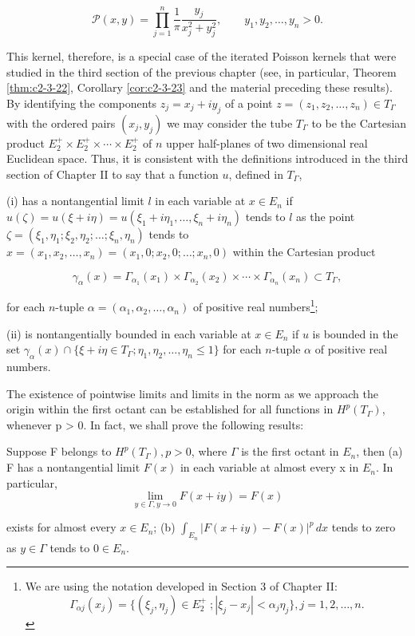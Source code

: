 \[
\mathcal{P}(x,y)=\prod_{j=1}^{n}\frac{1}{\pi}\frac{y_{j}}{x_{j}^{2}+y_{j}^{2}},\qquad y_{1},y_{2},\ldots,y_{n}>0.
\]

This kernel, therefore, is a special case of the iterated Poisson kernels that were studied in the third section of the previous chapter (see, in particular, Theorem \ref{thm:c2-3-22}, Corollary \ref{cor:c2-3-23} and the material preceding these results). By identifying the components $z_j = x_j + iy_j$ of a point $z = (z_1, z_2, \ldots, z_n) \in T_\Gamma$ with the ordered pairs $(x_j, y_j)$ we may consider the tube $T_\Gamma$ to be the Cartesian product $E_2^+ \times E_2^+\times\cdots\times E_2^+$ of $n$ upper half-planes of two dimensional real Euclidean space. Thus, it is consistent with the definitions introduced in the third section of Chapter II to say that a function $u$, defined in $T_\Gamma$,

(i) has a nontangential limit $l$ in each variable at $x \in E_n$ if $u(\zeta) = u(\xi + i\eta) = u(\xi_1 + i\eta_1, \ldots, \xi_n + i\eta_n)$ tends to $l$ as the point $\zeta = (\xi_1, \eta_1; \xi_2, \eta_2; \ldots; \xi_n, \eta_n)$ tends to $x = (x_1, x_2, \ldots, x_n) = (x_1, 0; x_2, 0; \ldots; x_n, 0)$ within the Cartesian product

\[
\gamma_{\alpha}(x)=\Gamma_{\alpha_{1}}(x_{1})\times\Gamma_{\alpha_{2}}(x_{2})\times\cdots\times\Gamma_{\alpha_{n}}(x_{n})\subset T_{\Gamma},
\]

for each $n$-tuple $\alpha = (\alpha_1, \alpha_2, \ldots, \alpha_n)$ of positive real numbers\footnote{We are using the notation developed in Section 3 of Chapter II: 
\[
\Gamma_{\alpha j}(x_{j})=\{(\xi_{j},\eta_{j})\in E_{2}^{+}\;;|\xi_{j}-x_{j}|<\alpha_{j}\eta_{j}\},j=1,2,\ldots,n.
\]};

(ii) is nontangentially bounded in each variable at $x \in E_n$ if $u$ is bounded in the set $\gamma_\alpha(x) \cap \{\xi + i\eta \in T_\Gamma; \eta_1, \eta_2, \ldots, \eta_n \leq 1\}$ for each $n$-tuple $\alpha$ of positive real numbers.

The existence of pointwise limits and limits in the norm as we approach the origin within the first octant can be established for all functions in $H^{p}(T_{\Gamma})$, whenever p > 0. In fact, we shall prove the following results:

\begin{theorem}
\label{thm:c3-5-1}
Suppose F belongs to $H^p(T_\Gamma), p > 0$, where $\Gamma$ is the first octant in $E_n$, then
(a) F has a nontangential limit $F(x)$ in each variable at almost every x in $E_n$. In particular,
\[
\lim_{y\in\Gamma,y\to0}F(x+iy)=F(x)
\]

exists for almost every $x \in E_n$;
(b) $\int_{E_n}|F(x + iy) - F(x)|^p \, dx$ tends to zero as $y \in \Gamma$ tends to $0 \in E_n$.
\end{theorem}

